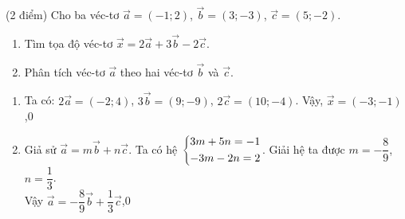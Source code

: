 \begin{ex}%
(2 điểm) Cho ba véc-tơ $\vec{a}=(-1;2)$, $\vec{b}=(3;-3)$, $\vec{c}=(5;-2)$.
\begin{enumerate}
\item Tìm tọa độ véc-tơ $\vec{x}=2\vec{a}+3\vec{b}-2\vec{c}$.
\item Phân tích véc-tơ $\vec{a}$ theo hai véc-tơ $\vec{b}$ và $\vec{c}$.
\end{enumerate}
\loigiai
{ \begin{enumerate}
	\item Ta có: $2\vec{a}=(-2;4)$, $3\vec{b}=(9;-9)$, $2\vec{c}=(10;-4)$. Vậy, $\vec{x}=(-3;-1)$,0
	\item Giả sử $\vec{a}=m\vec{b}+n\vec{c}$. Ta có hệ $\left\{\begin{aligned}3m+5n=-1\\-3m-2n=2\end{aligned}\right.$. Giải hệ ta được $m=-\dfrac{8}{9}$, $n=\dfrac{1}{3}$. \\Vậy $\vec{a}=-\dfrac{8}{9}\vec{b}+\dfrac{1}{3}\vec{c}$,0
\end{enumerate}}
\end{ex}
